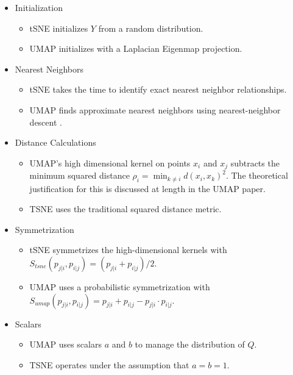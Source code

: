 \documentclass[sigconf, nonacm]{acmart}
\begin{document}
\begin{itemize}
    \item Initialization
        \begin{itemize}
        \item tSNE initializes $Y$ from a random distribution.
        \item UMAP initializes with a Laplacian Eigenmap projection.
        \end{itemize}

    \item Nearest Neighbors
        \begin{itemize}
        \item tSNE takes the time to identify exact nearest neighbor relationships.
        \item UMAP finds approximate nearest neighbors using nearest-neighbor descent \cite{dong2011efficient}.
        \end{itemize}

    \item Distance Calculations
        \begin{itemize}
        \item UMAP's high dimensional kernel on points $x_i$ and $x_j$ subtracts the minimum squared distance $\rho_i = \min_{k \neq i} d(x_i, x_k)^2$.
            The theoretical justification for this is discussed at length in the UMAP paper. 
        \item TSNE uses the traditional squared distance metric.
        \end{itemize}

    \item Symmetrization
        \begin{itemize}
        \item tSNE symmetrizes the high-dimensional kernels with $S_{tsne}(p_{j|i}, p_{i|j}) = (p_{j|i} + p_{i|j}) / 2$.
        \item UMAP uses a probabilistic symmetrization with $S_{umap}(p_{j|i}, p_{i|j}) = p_{j|i} + p_{i|j} - p_{j|i} \cdot p_{i|j}$.
        \end{itemize}

    \item Scalars
        \begin{itemize}
        \item UMAP uses scalars $a$ and $b$ to manage the distribution of $Q$.
        \item TSNE operates under the assumption that $a = b = 1$.
        \end{itemize}


\end{itemize}
\end{document}
